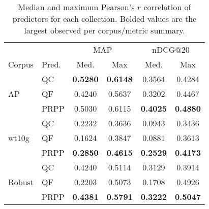 \documentclass{sig-alternate}
\begin{document}
\begin{table}
\begin{tabular}{|l|l|c|c|c|c|} \hline
& & \multicolumn{2}{c|}{MAP} & \multicolumn{2}{c|}{nDCG@20} \\ \cline{3-6}
Corpus & Pred. & Med. & Max & Med. & Max \\ \hline\hline
\multirow{3}{*}{AP} & QC & \textbf{0.5280} & \textbf{0.6148} & 0.3564 & 0.4284 \\ \cline{2-6}
& QF & 0.4240 & 0.5637 & 0.3202 & 0.4467 \\ \cline{2-6}
& PRPP & 0.5030 & 0.6115 & \textbf{0.4025} & \textbf{0.4880} \\ \hline\hline
\multirow{3}{*}{wt10g} & QC & 0.2232 & 0.3636 & 0.0943 & 0.3436 \\ \cline{2-6}
& QF & 0.1624 & 0.3847 & 0.0881 & 0.3613 \\ \cline{2-6}
& PRPP & \textbf{0.2850} & \textbf{0.4615} & \textbf{0.2529} & \textbf{0.4173} \\ \hline\hline
\multirow{3}{*}{Robust} & QC & 0.4240 & 0.5114 & 0.3129 & 0.3914 \\ \cline{2-6}
& QF & 0.2203 & 0.5073 & 0.1708 & 0.4926 \\ \cline{2-6}
& PRPP & \textbf{0.4381} & \textbf{0.5791} & \textbf{0.3222} & \textbf{0.5047} \\ \hline
\end{tabular}
\caption{Median and maximum Pearson's $r$ correlation of predictors for each collection. Bolded values are the largest observed per corpus/metric summary.}
\label{table.results.self.pearson}
\end{table}
\end{document}
